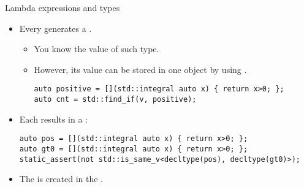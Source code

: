 \begin{frame}[t,fragile]{Lambda expressions and types}
\begin{itemize}
  \item Every  generates a 
        .
    \begin{itemize}
      \item You  know the value of such type.
      \item However, its value can be stored in one object by using .
\begin{lstlisting}
auto positive = [](std::integral auto x) { return x>0; };
auto cnt = std::find_if(v, positive);
\end{lstlisting}
    \end{itemize}

  \item Each  results in a :
\begin{lstlisting}
auto pos = [](std::integral auto x) { return x>0; };
auto gt0 = [](std::integral auto x) { return x>0; };
static_assert(not std::is_same_v<decltype(pos), decltype(gt0)>);
\end{lstlisting}

  \item The  is created in the .

\end{itemize}
\end{frame}


